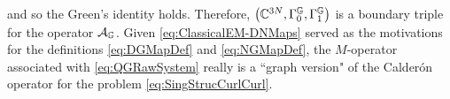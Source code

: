 and so the Green's identity holds. 
Therefore, $\left( \mathbb{C}^{3N}, \Gamma_0^{\mathbb{G}}, \Gamma_1^{\mathbb{G}} \right)$ is a boundary triple for the operator $\mathcal{A}_{\mathbb{G}}$.
Given \eqref{eq:ClassicalEM-DNMaps} served as the motivations for the definitions \eqref{eq:DGMapDef} and \eqref{eq:NGMapDef}, the $M$-operator associated with \eqref{eq:QGRawSystem} really is a ``graph version" of the Calder\'on operator for the problem \eqref{eq:SingStrucCurlCurl}.